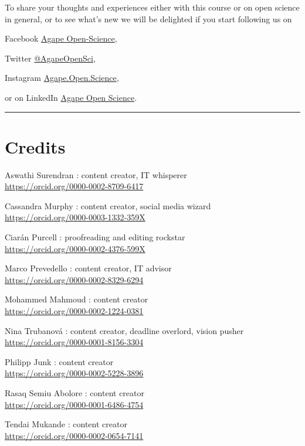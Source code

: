 \documentclass[
]{book}
\begin{document}
To share your thoughts and experiences either with this course or on open science in general, or to see what's new we will be delighted if you start following us on

Facebook {\href{https://facebook.com/AgapeOpen-Science}{Agape Open-Science}},

Twitter {\href{https://twitter.com/AgapeOpenSci}{@AgapeOpenSci}},

Instagram {\href{https://www.instagram.com/Agape.Open.Science}{Agape.Open.Science}},

or on LinkedIn {\href{https://www.linkedin.com/company/agape-open-science/}{Agape Open Science}}.

\begin{center}\rule{0.5\linewidth}{0.5pt}\end{center}

\hypertarget{credits}{%
\section*{Credits}\label{credits}}

Aswathi Surendran : content creator, IT whisperer\\
\url{https://orcid.org/0000-0002-8709-6417}

Cassandra Murphy : content creator, social media wizard\\
\url{https://orcid.org/0000-0003-1332-359X}

Ciarán Purcell : proofreading and editing rockstar\\
\url{https://orcid.org/0000-0002-4376-599X}

Marco Prevedello : content creator, IT advisor ~\\
\url{https://orcid.org/0000-0002-8329-6294}

Mohammed Mahmoud : content creator\\
\url{https://orcid.org/0000-0002-1224-0381}

Nina Trubanová : content creator, deadline overlord, vision pusher\\
\url{https://orcid.org/0000-0001-8156-3304}

Philipp Junk : content creator\\
\url{https://orcid.org/0000-0002-5228-3896}

Rasaq Semiu Abolore : content creator\\
\url{https://orcid.org/0000-0001-6486-4754}

Tendai Mukande : content creator\\
\url{https://orcid.org/0000-0002-0654-7141}
\end{document}
